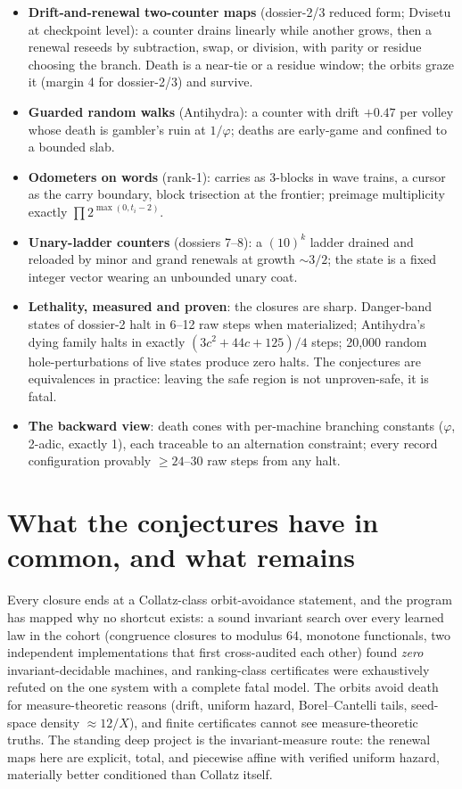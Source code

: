 \documentclass[11pt]{article}
\begin{document}
\begin{itemize}
\item \textbf{Drift-and-renewal two-counter maps} (dossier-2/3
reduced form; Dvisetu at checkpoint level): a counter drains
linearly while another grows, then a renewal reseeds by subtraction,
swap, or division, with parity or residue choosing the branch. Death
is a near-tie or a residue window; the orbits graze it (margin 4 for
dossier-2/3) and survive.
\item \textbf{Guarded random walks} (Antihydra): a counter with
drift $+0.47$ per volley whose death is gambler's ruin at
$1/\varphi$; deaths are early-game and confined to a bounded slab.
\item \textbf{Odometers on words} (rank-1): carries as 3-blocks in
wave trains, a cursor as the carry boundary, block trisection at the
frontier; preimage multiplicity exactly $\prod 2^{\max(0,t_i-2)}$.
\item \textbf{Unary-ladder counters} (dossiers 7--8): a $(10)^k$
ladder drained and reloaded by minor and grand renewals at growth
$\sim 3/2$; the state is a fixed integer vector wearing an
unbounded unary coat.
\item \textbf{Lethality, measured and proven}: the closures are
sharp. Danger-band states of dossier-2 halt in 6--12 raw steps when
materialized; Antihydra's dying family halts in exactly
$(3c^2+44c+125)/4$ steps; 20{,}000 random hole-perturbations of live
states produce zero halts. The conjectures are equivalences in
practice: leaving the safe region is not unproven-safe, it is fatal.
\item \textbf{The backward view}: death cones with per-machine
branching constants ($\varphi$, 2-adic, exactly 1), each traceable
to an alternation constraint; every record configuration provably
$\ge 24$--$30$ raw steps from any halt.
\end{itemize}

\section*{What the conjectures have in common, and what remains}

Every closure ends at a Collatz-class orbit-avoidance statement, and
the program has mapped why no shortcut exists: a sound invariant
search over every learned law in the cohort (congruence closures to
modulus 64, monotone functionals, two independent implementations
that first cross-audited each other) found \emph{zero}
invariant-decidable machines, and ranking-class certificates were
exhaustively refuted on the one system with a complete fatal model.
The orbits avoid death for measure-theoretic reasons (drift,
uniform hazard, Borel--Cantelli tails, seed-space density
$\approx 12/X$), and finite certificates cannot see
measure-theoretic truths. The standing deep project is the
invariant-measure route: the renewal maps here are explicit, total,
and piecewise affine with verified uniform hazard, materially
better conditioned than Collatz itself.
\end{document}
